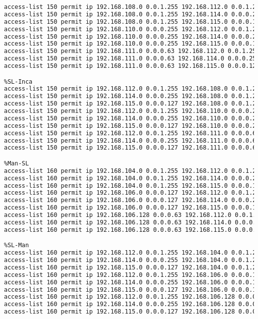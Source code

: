 \begin{lstlisting}[language=Bash, caption={Configuración ACLs Routers Interconexión}]
%Inca-SL
access-list 150 permit ip 192.168.108.0 0.0.1.255 192.168.112.0 0.0.1.255 
access-list 150 permit ip 192.168.108.0 0.0.1.255 192.168.114.0 0.0.0.255 
access-list 150 permit ip 192.168.108.0 0.0.1.255 192.168.115.0 0.0.0.127 
access-list 150 permit ip 192.168.110.0 0.0.0.255 192.168.112.0 0.0.1.255 
access-list 150 permit ip 192.168.110.0 0.0.0.255 192.168.114.0 0.0.0.255 
access-list 150 permit ip 192.168.110.0 0.0.0.255 192.168.115.0 0.0.0.127 
access-list 150 permit ip 192.168.111.0 0.0.0.63 192.168.112.0 0.0.1.255 
access-list 150 permit ip 192.168.111.0 0.0.0.63 192.168.114.0 0.0.0.255 
access-list 150 permit ip 192.168.111.0 0.0.0.63 192.168.115.0 0.0.0.127

%SL-Inca
access-list 150 permit ip 192.168.112.0 0.0.1.255 192.168.108.0 0.0.1.255  
access-list 150 permit ip 192.168.114.0 0.0.0.255 192.168.108.0 0.0.1.255  
access-list 150 permit ip 192.168.115.0 0.0.0.127 192.168.108.0 0.0.1.255  
access-list 150 permit ip 192.168.112.0 0.0.1.255 192.168.110.0 0.0.0.255  
access-list 150 permit ip 192.168.114.0 0.0.0.255 192.168.110.0 0.0.0.255  
access-list 150 permit ip 192.168.115.0 0.0.0.127 192.168.110.0 0.0.0.255  
access-list 150 permit ip 192.168.112.0 0.0.1.255 192.168.111.0 0.0.0.63  
access-list 150 permit ip 192.168.114.0 0.0.0.255 192.168.111.0 0.0.0.63  
access-list 150 permit ip 192.168.115.0 0.0.0.127 192.168.111.0 0.0.0.63 

%Man-SL
access-list 160 permit ip 192.168.104.0 0.0.1.255 192.168.112.0 0.0.1.255
access-list 160 permit ip 192.168.104.0 0.0.1.255 192.168.114.0 0.0.0.255
access-list 160 permit ip 192.168.104.0 0.0.1.255 192.168.115.0 0.0.0.127
access-list 160 permit ip 192.168.106.0 0.0.0.127 192.168.112.0 0.0.1.255
access-list 160 permit ip 192.168.106.0 0.0.0.127 192.168.114.0 0.0.0.255
access-list 160 permit ip 192.168.106.0 0.0.0.127 192.168.115.0 0.0.0.127
access-list 160 permit ip 192.168.106.128 0.0.0.63 192.168.112.0 0.0.1.255
access-list 160 permit ip 192.168.106.128 0.0.0.63 192.168.114.0 0.0.0.255
access-list 160 permit ip 192.168.106.128 0.0.0.63 192.168.115.0 0.0.0.127

%SL-Man
access-list 160 permit ip 192.168.112.0 0.0.1.255 192.168.104.0 0.0.1.255 
access-list 160 permit ip 192.168.114.0 0.0.0.255 192.168.104.0 0.0.1.255 
access-list 160 permit ip 192.168.115.0 0.0.0.127 192.168.104.0 0.0.1.255 
access-list 160 permit ip 192.168.112.0 0.0.1.255 192.168.106.0 0.0.0.127 
access-list 160 permit ip 192.168.114.0 0.0.0.255 192.168.106.0 0.0.0.127 
access-list 160 permit ip 192.168.115.0 0.0.0.127 192.168.106.0 0.0.0.127 
access-list 160 permit ip 192.168.112.0 0.0.1.255 192.168.106.128 0.0.0.63 
access-list 160 permit ip 192.168.114.0 0.0.0.255 192.168.106.128 0.0.0.63 
access-list 160 permit ip 192.168.115.0 0.0.0.127 192.168.106.128 0.0.0.63 
\end{lstlisting}

